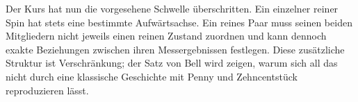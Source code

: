 \begin{classroomqa}
\end{classroomqa}

Der Kurs hat nun die vorgesehene Schwelle überschritten. Ein einzelner reiner Spin hat stets eine bestimmte Aufwärtsachse. Ein reines Paar muss seinen beiden Mitgliedern nicht jeweils einen reinen Zustand zuordnen und kann dennoch exakte Beziehungen zwischen ihren Messergebnissen festlegen. Diese zusätzliche Struktur ist Verschränkung; der Satz von Bell wird zeigen, warum sich all das nicht durch eine klassische Geschichte mit Penny und Zehncentstück reproduzieren lässt.